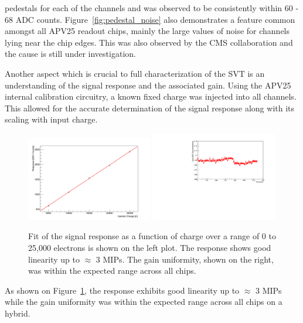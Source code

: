 pedestals for each of the channels and was observed to be consistently within 
60 - 68 ADC counts. 
Figure~\ref{fig:pedestal_noise} also demonstrates a feature common amongst 
all APV25 readout chips, mainly the large values of noise for channels 
lying near the chip edges.  This was also  observed by the CMS 
collaboration and the cause is still under investigation.

Another aspect which is crucial to full characterization of the SVT is an 
understanding of the signal response and the associated gain.
Using the APV25 internal calibration circuitry, a known fixed charge was 
injected into all channels.  This allowed for the accurate determination
of the signal response along with its scaling with input charge.
\begin{figure}[h]
    \begin{center}
        \includegraphics[width=0.49\textwidth]{test2012/svtperformance/svt_calib/response_curve_fpga0_hybrid0_channel0.png}
        \includegraphics[width=0.49\textwidth]{test2012/svtperformance/svt_calib/gain_stability_fpga0_hybrid0.pdf}
        \caption{Fit of the signal response as a function of charge over a 
                 range of 0 to 25,000 electrons is shown on the left plot.
                 The response shows good linearity up to $\approx$ 3 MIPs. The
                 gain uniformity, shown on the right, was within the expected
                 range across all chips.
                }
        \label{fig:gain} 
    \end{center}
\end{figure}
As shown on Figure~\ref{fig:gain}, the response exhibits good linearity up 
to $\approx$ 3 MIPs while the gain uniformity was within the expected range 
across all chips on a hybrid.

